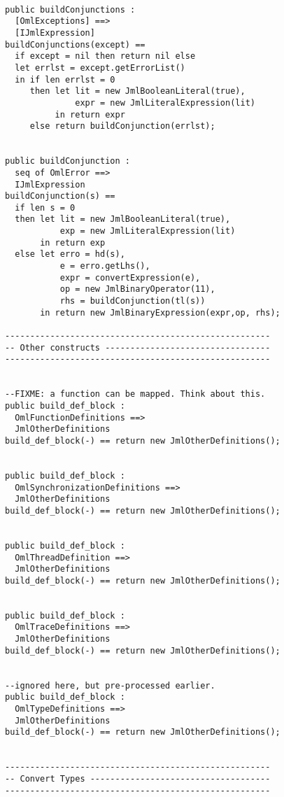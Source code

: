 \begin{lstlisting}
  
public buildConjunctions : 
  [OmlExceptions] ==>
  [IJmlExpression]
buildConjunctions(except) ==
  if except = nil then return nil else 
  let errlst = except.getErrorList()
  in if len errlst = 0
     then let lit = new JmlBooleanLiteral(true),
	          expr = new JmlLiteralExpression(lit)
		  in return expr
     else return buildConjunction(errlst);
	 
	 
public buildConjunction :
  seq of OmlError ==>
  IJmlExpression
buildConjunction(s) ==
  if len s = 0 
  then let lit = new JmlBooleanLiteral(true),
           exp = new JmlLiteralExpression(lit)
	   in return exp
  else let erro = hd(s),
           e = erro.getLhs(),
		   expr = convertExpression(e),
		   op = new JmlBinaryOperator(11),
		   rhs = buildConjunction(tl(s))
	   in return new JmlBinaryExpression(expr,op, rhs);

-----------------------------------------------------
-- Other constructs ---------------------------------
-----------------------------------------------------


--FIXME: a function can be mapped. Think about this.
public build_def_block : 
  OmlFunctionDefinitions ==> 
  JmlOtherDefinitions
build_def_block(-) == return new JmlOtherDefinitions();


public build_def_block : 
  OmlSynchronizationDefinitions ==> 
  JmlOtherDefinitions
build_def_block(-) == return new JmlOtherDefinitions();


public build_def_block : 
  OmlThreadDefinition ==> 
  JmlOtherDefinitions
build_def_block(-) == return new JmlOtherDefinitions();


public build_def_block : 
  OmlTraceDefinitions ==> 
  JmlOtherDefinitions
build_def_block(-) == return new JmlOtherDefinitions();


--ignored here, but pre-processed earlier.
public build_def_block : 
  OmlTypeDefinitions ==> 
  JmlOtherDefinitions
build_def_block(-) == return new JmlOtherDefinitions();


-----------------------------------------------------
-- Convert Types ------------------------------------
-----------------------------------------------------



\end{lstlisting}
